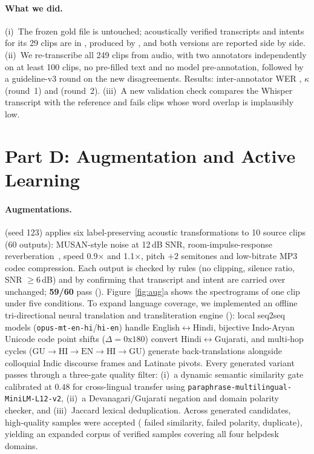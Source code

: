 \documentclass[sigconf,authordraft]{acmart}
\begin{document}
\paragraph{What we did.}
(i)~The frozen gold file is untouched; acoustically verified transcripts and intents for its 29 clips are in , produced by , and both versions are reported side by side. (ii)~We re-transcribe all 249 clips from audio, with two annotators independently on at least 100 clips, no pre-filled text and no model pre-annotation, followed by a guideline-v3 round on the new disagreements. Results: inter-annotator WER \RelabWER{}, $\kappa$ \RelabKapOne{} (round~1) and \RelabKapTwo{} (round~2). (iii)~A new validation check compares the Whisper transcript with the reference and fails clips whose word overlap is implausibly low.

\section{Part D: Augmentation and Active Learning}\label{sec:aug}
\paragraph{Augmentations.}
 (seed 123) applies six label-preserving acoustic transformations to 10 source clips (60 outputs): MUSAN-style noise at 12\,dB SNR, room-impulse-response reverberation~\cite{Ko2017}, speed 0.9$\times$ and 1.1$\times$, pitch $+2$ semitones and low-bitrate MP3 codec compression. Each output is checked by rules (no clipping, silence ratio, SNR $\ge6$\,dB) and by confirming that transcript and intent are carried over unchanged; \textbf{59/60} pass (). Figure~\ref{fig:aug}a shows the spectrograms of one clip under five conditions.
To expand language coverage, we implemented an offline tri-directional neural translation and transliteration engine (): local seq2seq models (\texttt{opus-mt-en-hi}/\texttt{hi-en}) handle English$\leftrightarrow$Hindi, bijective Indo-Aryan Unicode code point shifts ($\Delta=0\text{x}180$) convert Hindi$\leftrightarrow$Gujarati, and multi-hop cycles ($\text{GU}\to\text{HI}\to\text{EN}\to\text{HI}\to\text{GU}$) generate back-translations alongside colloquial Indic discourse frames and Latinate pivots. Every generated variant passes through a three-gate quality filter: (i)~a dynamic semantic similarity gate calibrated at $0.48$ for cross-lingual transfer using \texttt{paraphrase-multilingual-MiniLM-L12-v2}, (ii)~a Devanagari/Gujarati negation and domain polarity checker, and (iii)~Jaccard lexical deduplication. Across \AugGenerated{} generated candidates, \textbf{\AugAccepted{}} high-quality samples were accepted (\AugGateOneRej{} failed similarity, \AugGateTwoRej{} failed polarity, \AugGateThreeRej{} duplicate), yielding an expanded corpus of \textbf{\AugTotalPool{}} verified samples covering all four helpdesk domains.
\end{document}
